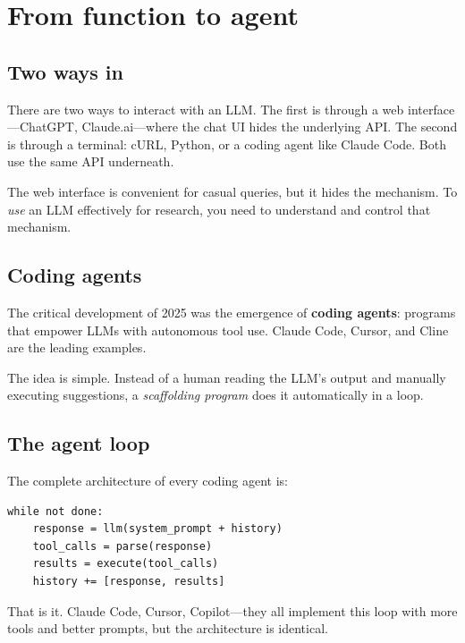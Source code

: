 
\section{From function to agent}\label{sec:agents}

\subsection{Two ways in}

There are two ways to interact with an LLM\@.  The first is through a
web interface---ChatGPT, Claude.ai---where the chat UI hides the
underlying API\@.  The second is through a terminal: cURL, Python, or a
coding agent like Claude Code.  Both use the same API underneath.

The web interface is convenient for casual queries, but it hides the
mechanism.  To \emph{use} an LLM effectively for research, you need to
understand and control that mechanism.

\subsection{Coding agents}

The critical development of 2025 was the emergence of \textbf{coding
agents}: programs that empower LLMs with autonomous tool use.  Claude
Code, Cursor, and Cline are the leading examples.

The idea is simple.  Instead of a human reading the LLM's output and
manually executing suggestions, a \emph{scaffolding program} does it
automatically in a loop.

\subsection{The agent loop}

\begin{keyresult}
  The complete architecture of every coding agent is:
  \begin{lstlisting}
while not done:
    response = llm(system_prompt + history)
    tool_calls = parse(response)
    results = execute(tool_calls)
    history += [response, results]
  \end{lstlisting}
  That is it.  Claude Code, Cursor, Copilot---they all implement this
  loop with more tools and better prompts, but the architecture is
  identical.
\end{keyresult}

